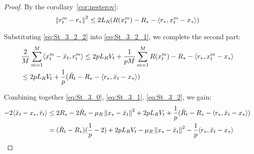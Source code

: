 \begin{proof}
    By the corollary~\ref{cor:nesterov}:
    \begin{align}
        \norm{r^m_t-r_*}^2 \leq 2L_R (R(x^m_t) - R_* - \inner {r_*}{x^m_t - x_*}) \label{eq:St_3_2_2}
    \end{align}
    
    Substituting \eqref{eq:St_3_2_2} into \eqref{eq:St_3_2_1}, we complete the second part:
    \begin{align}
        &\frac{2}{M} \summ{m=1}{M}{\inner{x^m_t - \bar{x}_t}{r^m_t}}
        \leq 2 p L_R V_t 
        + \frac{1}{pM} \summ{m=1}{M}{R(x^m_t) - R_* - \inner {r_*}{x^m_t - x_*} } \\
        &\leq 2 p L_R V_t 
        + \frac{1}{p} (\bar{R}_t - R_* - \inner {r_*}{\bar{x}_t - x_*}) \label{eq:St_3_2}
    \end{align}
    
    Combining together \eqref{eq:St_3_0}, \eqref{eq:St_3_1}, \eqref{eq:St_3_2}, we gain:
    \begin{align}
         - 2 \inner{\bar{x}_t - x_*}{\bar{r}_t} &\leq
         2 R_* - 2 \bar{R}_t - \mu_R \norm{x_* - \bar{x}_t}^2 
         + 2 p L_R V_t + \frac{1}{p} (\bar{R}_t - R_* - \inner {r_*}{\bar{x}_t - x_*}) \\ 
         &= (\bar{R}_t - R_*)(\frac{1}{p} - 2) + 2 p L_R V_t - \mu_R \norm{x_* - \bar{x}_t}^2 
         - \frac{1}{p}\inner{r_*}{\bar{x}_t - x_*}
         \label{eq:St_3}
    \end{align}
\end{proof}

